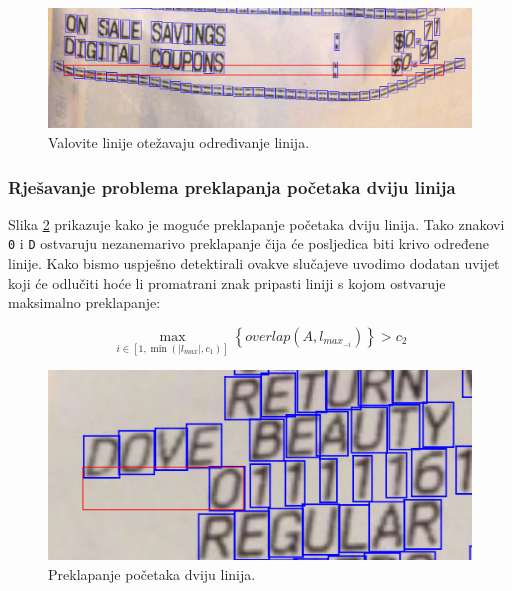 \documentclass[times, utf8, zavrsni]{fer}
\begin{document}
\begin{figure}[htb]
    \centering
    \captionsetup{justification=centering,margin=2cm}
    \includegraphics[width=\textwidth]{images/aligner-01.png}
    \caption{Valovite linije otežavaju određivanje linija.}
    \label{fig:aligner-01}
\end{figure}


\subsubsection{Rješavanje problema preklapanja početaka dviju linija}
Slika \ref{fig:overlap-01} prikazuje kako je moguće preklapanje početaka dviju
linija. Tako znakovi \lstinline{0} i \lstinline{D}
ostvaruju nezanemarivo preklapanje čija će posljedica biti krivo određene
linije. Kako bismo uspješno detektirali ovakve slučajeve uvodimo dodatan uvijet
koji će odlučiti hoće li promatrani znak pripasti liniji s kojom ostvaruje
maksimalno preklapanje:

\begin{equation}
\label{eq:overlap-03}
\max_{i \in [1, \min(|l_{max}|, c_1)]}\left\{\textit{overlap}(A, l_{max_{-i}})\right\} > c_2
\end{equation}

\begin{figure}[htb]
    \centering
    \captionsetup{justification=centering,margin=2cm}
    \includegraphics[width=\textwidth]{images/overlap-01.png}
    \caption{Preklapanje početaka dviju linija.}
    \label{fig:overlap-01}
\end{figure}
\end{document}
